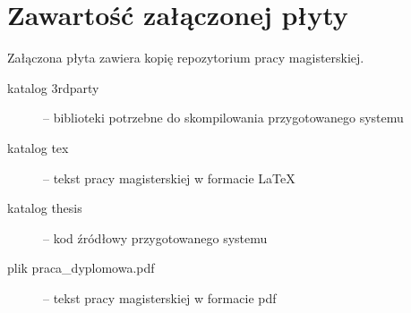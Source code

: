 \chapter{Zawartość załączonej płyty}

Załączona płyta zawiera kopię repozytorium pracy magisterskiej.

\begin{description}

\item[katalog 3rdparty] --
biblioteki potrzebne do skompilowania przygotowanego systemu

\item[katalog tex] --
tekst pracy magisterskiej w formacie \LaTeX

\item[katalog thesis] --
kod źródłowy przygotowanego systemu

\item[plik praca\_dyplomowa.pdf] --
tekst pracy magisterskiej w formacie pdf


\end{description}
